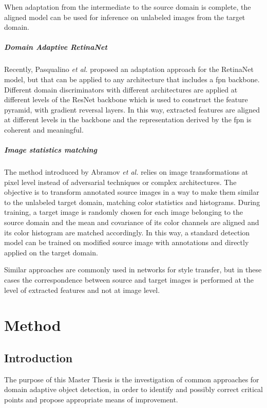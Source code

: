 \documentclass[%
    corpo=12pt,
    twoside,
    stile=classica,   
    tipotesi=magistrale,
    evenboxes,
    english,
	numerazioneromana,
]{toptesi}
\begin{document}
When adaptation from the intermediate to the source domain is complete, the aligned model can be used for inference on unlabeled images from the target domain.

\paragraph{Domain Adaptive RetinaNet}\label{sec:daretinanet}
Recently, Pasqualino \emph{et al.}\cite{pasqualino2020unsupervised} proposed an adaptation approach for the RetinaNet model, but that can be applied to any architecture that includes a \gls{fpn} backbone. Different domain discriminators with different architectures are applied at different levels of the ResNet backbone which is used to construct the feature pyramid, with gradient reversal layers. In this way, extracted features are aligned at different levels in the backbone and the representation derived by the \gls{fpn} is coherent and meaningful.

\paragraph{Image statistics matching}\label{sec:kis}
The method introduced by Abramov \emph{et al.}\cite{abramov2020simple} relies on image transformations at pixel level instead of adversarial techniques or complex architectures. The objective is to transform annotated source images in a way to make them similar to the unlabeled target domain, matching color statistics and histograms. During training, a target image is randomly chosen for each image belonging to the source domain and the mean and covariance of its color channels are aligned and its color histogram are matched accordingly. In this way, a standard detection model can be trained on modified source image with annotations and directly applied on the target domain.

Similar approaches are commonly used in networks for style transfer, but in these cases the correspondence between source and target images is performed at the level of extracted features and not at image level.



\chapter{Method}
\section{Introduction}
The purpose of this Master Thesis is the investigation of common approaches for domain adaptive object detection, in order to identify and possibly correct critical points and propose appropriate means of improvement.
\end{document}
